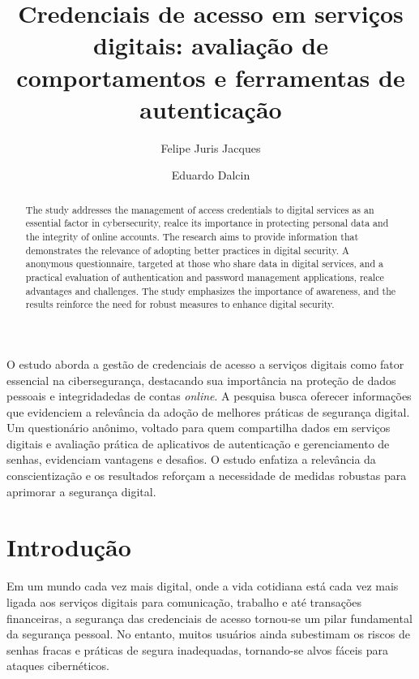 \documentclass[12pt]{article}
\title{Credenciais de acesso em serviços digitais: avaliação de comportamentos e ferramentas de autenticação}
\author{Felipe Juris Jacques\inst{1} \and Eduardo Dalcin\inst{1} }
\begin{document}
 

\maketitle

\begin{abstract}
  The study addresses the management of access credentials to digital services as an
  essential factor in cybersecurity, realce its importance in protecting personal
  data and the integrity of online accounts.
  The research aims to provide information that demonstrates the relevance of adopting
  better practices in digital security.
  A anonymous questionnaire, targeted at those who share data in digital services, and a
  practical evaluation of authentication and password management applications, realce
  advantages and challenges.
  The study emphasizes the importance of awareness, and the results reinforce the need for
  robust measures to enhance digital security.
\end{abstract}
     
\begin{resumo}
  O estudo aborda a gestão de credenciais de acesso a serviços digitais como fator
  essencial na cibersegurança, destacando sua importância na proteção de dados pessoais
  e integridadedas de contas \textit{online}.
  A pesquisa busca oferecer informações que evidenciem a relevância da adoção de
  melhores práticas de segurança digital.
  Um questionário anônimo, voltado para quem compartilha dados em serviços digitais e
  avaliação prática de aplicativos de autenticação e gerenciamento de senhas, evidenciam
  vantagens e desafios.
  O estudo enfatiza a relevância da conscientização e os resultados reforçam a
  necessidade de medidas robustas para aprimorar a segurança digital.
\end{resumo}

\section{Introdução}

Em um mundo cada vez mais digital, onde a vida cotidiana está cada vez mais ligada aos
serviços digitais para comunicação, trabalho e até transações financeiras, a segurança
das credenciais de acesso tornou-se um pilar fundamental da segurança pessoal.
No entanto, muitos usuários ainda subestimam os riscos de senhas fracas e práticas
de segura inadequadas, tornando-se alvos fáceis para ataques cibernéticos.
\end{document}
